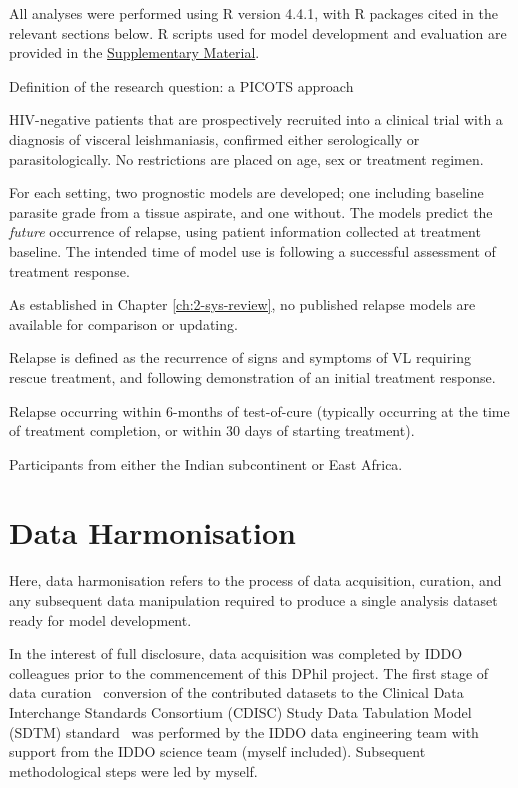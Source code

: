 All analyses were performed using R version 4.4.1\cite{r2025}, with R packages cited in the relevant sections below. R scripts used for model development and evaluation are provided in the \href{https://github.com/jpwil/dphil}{Supplementary Material}.

\begin{mybox}[label=box:picots]{Definition of the research question: a PICOTS approach}
  \begin{description}[nosep]
    \item[Population] HIV-negative patients that are prospectively recruited into a clinical trial with a diagnosis of visceral leishmaniasis, confirmed either serologically or parasitologically. No restrictions are placed on age, sex or treatment regimen.
    \item[Index models] For each setting, two prognostic models are developed; one including baseline parasite grade from a tissue aspirate, and one without. The models predict the \textit{future} occurrence of relapse, using patient information collected at treatment baseline. The intended time of model use is following a successful assessment of treatment response.
    \item[Comparator model] As established in Chapter \ref{ch:2-sys-review}, no published relapse models are available for comparison or updating.
    \item[Outcome] Relapse is defined as the recurrence of signs and symptoms of VL requiring rescue treatment, and following demonstration of an initial treatment response.
    \item[Timing] Relapse occurring within 6-months of test-of-cure (typically occurring at the time of treatment completion, or within 30 days of starting treatment).
    \item[Setting] Participants from either the Indian subcontinent or East Africa.
  \end{description}
\end{mybox}

\section*{Data Harmonisation}

Here, data harmonisation refers to the process of data acquisition, curation, and any subsequent data manipulation required to produce a single analysis dataset ready for model development.

In the interest of full disclosure, data acquisition was completed by IDDO colleagues prior to the commencement of this DPhil project. The first stage of data curation \textemdash\ conversion of the contributed datasets to the Clinical Data Interchange Standards Consortium (CDISC) Study Data Tabulation Model (SDTM) standard \textemdash\ was performed by the IDDO data engineering team with support from the IDDO science team (myself included). Subsequent methodological steps were led by myself.

